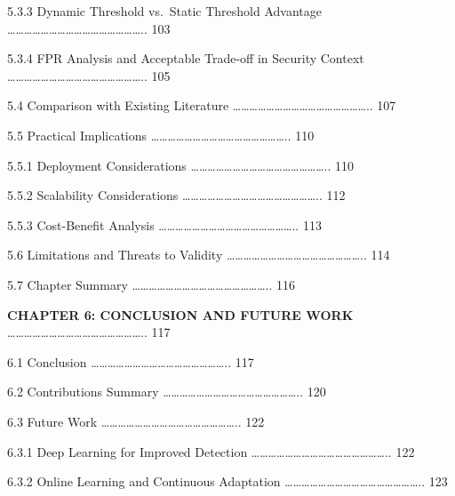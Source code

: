 \documentclass[
  a4paper]{report}
\begin{document}
5.3.3 Dynamic Threshold vs.~Static Threshold Advantage
\ldots\ldots\ldots\ldots\ldots\ldots\ldots\ldots\ldots\ldots\ldots\ldots\ldots\ldots\ldots\ldots..
103

5.3.4 FPR Analysis and Acceptable Trade-off in Security Context
\ldots\ldots\ldots\ldots\ldots\ldots\ldots\ldots\ldots\ldots\ldots\ldots\ldots\ldots\ldots\ldots..
105

5.4 Comparison with Existing Literature
\ldots\ldots\ldots\ldots\ldots\ldots\ldots\ldots\ldots\ldots\ldots\ldots\ldots\ldots\ldots\ldots..
107

5.5 Practical Implications
\ldots\ldots\ldots\ldots\ldots\ldots\ldots\ldots\ldots\ldots\ldots\ldots\ldots\ldots\ldots\ldots..
110

5.5.1 Deployment Considerations
\ldots\ldots\ldots\ldots\ldots\ldots\ldots\ldots\ldots\ldots\ldots\ldots\ldots\ldots\ldots\ldots..
110

5.5.2 Scalability Considerations
\ldots\ldots\ldots\ldots\ldots\ldots\ldots\ldots\ldots\ldots\ldots\ldots\ldots\ldots\ldots\ldots..
112

5.5.3 Cost-Benefit Analysis
\ldots\ldots\ldots\ldots\ldots\ldots\ldots\ldots\ldots\ldots\ldots\ldots\ldots\ldots\ldots\ldots..
113

5.6 Limitations and Threats to Validity
\ldots\ldots\ldots\ldots\ldots\ldots\ldots\ldots\ldots\ldots\ldots\ldots\ldots\ldots\ldots\ldots..
114

5.7 Chapter Summary
\ldots\ldots\ldots\ldots\ldots\ldots\ldots\ldots\ldots\ldots\ldots\ldots\ldots\ldots\ldots\ldots..
116

\textbf{CHAPTER 6: CONCLUSION AND FUTURE WORK}
\ldots\ldots\ldots\ldots\ldots\ldots\ldots\ldots\ldots\ldots\ldots\ldots\ldots\ldots\ldots\ldots..
117

6.1 Conclusion
\ldots\ldots\ldots\ldots\ldots\ldots\ldots\ldots\ldots\ldots\ldots\ldots\ldots\ldots\ldots\ldots..
117

6.2 Contributions Summary
\ldots\ldots\ldots\ldots\ldots\ldots\ldots\ldots\ldots\ldots\ldots\ldots\ldots\ldots\ldots\ldots..
120

6.3 Future Work
\ldots\ldots\ldots\ldots\ldots\ldots\ldots\ldots\ldots\ldots\ldots\ldots\ldots\ldots\ldots\ldots..
122

6.3.1 Deep Learning for Improved Detection
\ldots\ldots\ldots\ldots\ldots\ldots\ldots\ldots\ldots\ldots\ldots\ldots\ldots\ldots\ldots\ldots..
122

6.3.2 Online Learning and Continuous Adaptation
\ldots\ldots\ldots\ldots\ldots\ldots\ldots\ldots\ldots\ldots\ldots\ldots\ldots\ldots\ldots\ldots..
123
\end{document}
